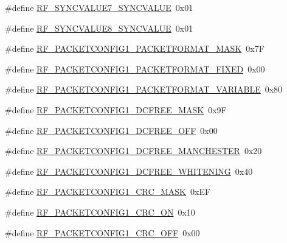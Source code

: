 \begin{DoxyCompactItemize}
\item 
\#define \mbox{\hyperlink{sx1276_regs-_fsk_8h_a98fd9daba44f509a22b528f6ce39a8ca}{R\+F\+\_\+\+S\+Y\+N\+C\+V\+A\+L\+U\+E7\+\_\+\+S\+Y\+N\+C\+V\+A\+L\+UE}}~0x01
\item 
\#define \mbox{\hyperlink{sx1276_regs-_fsk_8h_aed618a9d802603a9727223a9b66fa39e}{R\+F\+\_\+\+S\+Y\+N\+C\+V\+A\+L\+U\+E8\+\_\+\+S\+Y\+N\+C\+V\+A\+L\+UE}}~0x01
\item 
\#define \mbox{\hyperlink{sx1276_regs-_fsk_8h_a49a5b9d17a41eac837198daf073a8bc2}{R\+F\+\_\+\+P\+A\+C\+K\+E\+T\+C\+O\+N\+F\+I\+G1\+\_\+\+P\+A\+C\+K\+E\+T\+F\+O\+R\+M\+A\+T\+\_\+\+M\+A\+SK}}~0x7F
\item 
\#define \mbox{\hyperlink{sx1276_regs-_fsk_8h_a9bcb87a30f7c182b7434cb87fdcb8187}{R\+F\+\_\+\+P\+A\+C\+K\+E\+T\+C\+O\+N\+F\+I\+G1\+\_\+\+P\+A\+C\+K\+E\+T\+F\+O\+R\+M\+A\+T\+\_\+\+F\+I\+X\+ED}}~0x00
\item 
\#define \mbox{\hyperlink{sx1276_regs-_fsk_8h_a3ea46ce872f527e487bfc9ad5bc04fda}{R\+F\+\_\+\+P\+A\+C\+K\+E\+T\+C\+O\+N\+F\+I\+G1\+\_\+\+P\+A\+C\+K\+E\+T\+F\+O\+R\+M\+A\+T\+\_\+\+V\+A\+R\+I\+A\+B\+LE}}~0x80
\item 
\#define \mbox{\hyperlink{sx1276_regs-_fsk_8h_a16146b7b76f771448f92a63952fed8ba}{R\+F\+\_\+\+P\+A\+C\+K\+E\+T\+C\+O\+N\+F\+I\+G1\+\_\+\+D\+C\+F\+R\+E\+E\+\_\+\+M\+A\+SK}}~0x9F
\item 
\#define \mbox{\hyperlink{sx1276_regs-_fsk_8h_a3ff7ed664dafac3f35c529684e793afd}{R\+F\+\_\+\+P\+A\+C\+K\+E\+T\+C\+O\+N\+F\+I\+G1\+\_\+\+D\+C\+F\+R\+E\+E\+\_\+\+O\+FF}}~0x00
\item 
\#define \mbox{\hyperlink{sx1276_regs-_fsk_8h_aa8d6a62ddb02dee4e3d477c9c6a7e621}{R\+F\+\_\+\+P\+A\+C\+K\+E\+T\+C\+O\+N\+F\+I\+G1\+\_\+\+D\+C\+F\+R\+E\+E\+\_\+\+M\+A\+N\+C\+H\+E\+S\+T\+ER}}~0x20
\item 
\#define \mbox{\hyperlink{sx1276_regs-_fsk_8h_aca0b24d6db23ec11341111780a769c46}{R\+F\+\_\+\+P\+A\+C\+K\+E\+T\+C\+O\+N\+F\+I\+G1\+\_\+\+D\+C\+F\+R\+E\+E\+\_\+\+W\+H\+I\+T\+E\+N\+I\+NG}}~0x40
\item 
\#define \mbox{\hyperlink{sx1276_regs-_fsk_8h_ad7dcff9e6dc9092816aea02a997fbce2}{R\+F\+\_\+\+P\+A\+C\+K\+E\+T\+C\+O\+N\+F\+I\+G1\+\_\+\+C\+R\+C\+\_\+\+M\+A\+SK}}~0x\+EF
\item 
\#define \mbox{\hyperlink{sx1276_regs-_fsk_8h_ad7837efcf34cc8d322f9a6804d6862cc}{R\+F\+\_\+\+P\+A\+C\+K\+E\+T\+C\+O\+N\+F\+I\+G1\+\_\+\+C\+R\+C\+\_\+\+ON}}~0x10
\item 
\#define \mbox{\hyperlink{sx1276_regs-_fsk_8h_adadf61508b683e35a68324d98bf08ae7}{R\+F\+\_\+\+P\+A\+C\+K\+E\+T\+C\+O\+N\+F\+I\+G1\+\_\+\+C\+R\+C\+\_\+\+O\+FF}}~0x00

\end{DoxyCompactItemize}
